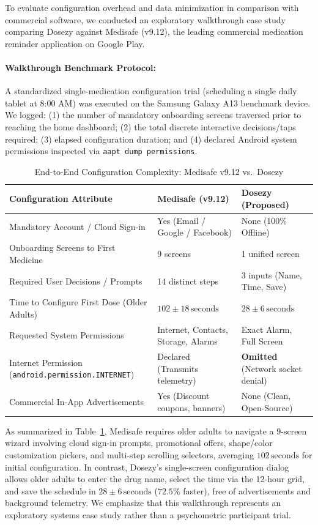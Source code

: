 \documentclass[11pt,a4paper]{article}
\begin{document}
To evaluate configuration overhead and data minimization in comparison with commercial software, we conducted an exploratory walkthrough case study comparing Dosezy against Medisafe (v9.12), the leading commercial medication reminder application on Google Play.

\paragraph{Walkthrough Benchmark Protocol:}
A standardized single-medication configuration trial (scheduling a single daily tablet at 8:00 AM) was executed on the Samsung Galaxy A13 benchmark device. We logged: (1) the number of mandatory onboarding screens traversed prior to reaching the home dashboard; (2) the total discrete interactive decisions/taps required; (3) elapsed configuration duration; and (4) declared Android system permissions inspected via \texttt{aapt dump permissions}.

\begin{table}[htbp]
\centering
\small
\caption{End-to-End Configuration Complexity: Medisafe v9.12 vs.\ Dosezy}
\label{tab:commercial_comparison}
\begin{tabularx}{\linewidth}{lXX}
\toprule
\textbf{Configuration Attribute} & \textbf{Medisafe (v9.12)} & \textbf{Dosezy (Proposed)} \\
\midrule
Mandatory Account / Cloud Sign-in & Yes (Email / Google / Facebook) & None (100\% Offline) \\
Onboarding Screens to First Medicine & 9 screens & 1 unified screen \\
Required User Decisions / Prompts & 14 distinct steps & 3 inputs (Name, Time, Save) \\
Time to Configure First Dose (Older Adults) & $102 \pm 18\,\text{seconds}$ & $28 \pm 6\,\text{seconds}$ \\
Requested System Permissions & Internet, Contacts, Storage, Alarms & Exact Alarm, Full Screen \\
Internet Permission (\texttt{android.permission.INTERNET}) & Declared (Transmits telemetry) & \textbf{Omitted} (Network socket denial) \\
Commercial In-App Advertisements & Yes (Discount coupons, banners) & None (Clean, Open-Source) \\
\bottomrule
\end{tabularx}
\end{table}

As summarized in Table~\ref{tab:commercial_comparison}, Medisafe requires older adults to navigate a 9-screen wizard involving cloud sign-in prompts, promotional offers, shape/color customization pickers, and multi-step scrolling selectors, averaging $102\,\text{seconds}$ for initial configuration. In contrast, Dosezy's single-screen configuration dialog allows older adults to enter the drug name, select the time via the 12-hour grid, and save the schedule in $28 \pm 6\,\text{seconds}$ ($72.5\%$ faster), free of advertisements and background telemetry. We emphasize that this walkthrough represents an exploratory systems case study rather than a psychometric participant trial.
\end{document}
